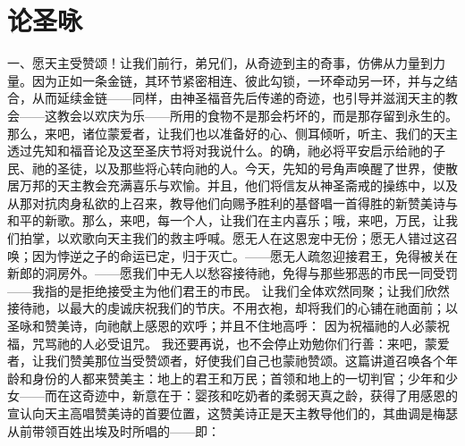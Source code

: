 
\chapter{论圣咏}


一、愿天主受赞颂！让我们前行，弟兄们，从奇迹到主的奇事，仿佛从力量到力量。因为正如一条金链，其环节紧密相连、彼此勾锁，一环牵动另一环，并与之结合，从而延续金链——同样，由神圣福音先后传递的奇迹，也引导并滋润天主的教会——这教会以欢庆为乐——所用的食物不是那会朽坏的，而是那存留到永生的。 那么，来吧，诸位蒙爱者，让我们也以准备好的心、侧耳倾听，听主、我们的天主透过先知和福音论及这至圣庆节将对我说什么。的确，祂必将平安启示给祂的子民、祂的圣徒，以及那些将心转向祂的人。今天，先知的号角声唤醒了世界，使散居万邦的天主教会充满喜乐与欢愉。并且，他们将信友从神圣斋戒的操练中，以及从那对抗肉身私欲的上召来，教导他们向赐予胜利的基督唱一首得胜的新赞美诗与和平的新歌。那么，来吧，每一个人，让我们在主内喜乐；哦，来吧，万民，让我们拍掌，以欢歌向天主我们的救主呼喊。愿无人在这恩宠中无份；愿无人错过这召唤；因为悖逆之子的命运已定，归于灭亡。——愿无人疏忽迎接君王，免得被关在新郎的洞房外。——愿我们中无人以愁容接待祂，免得与那些邪恶的市民一同受罚——我指的是拒绝接受主为他们君王的市民。 让我们全体欢然同聚；让我们欣然接待祂，以最大的虔诚庆祝我们的节庆。不用衣袍，却将我们的心铺在祂面前；以圣咏和赞美诗，向祂献上感恩的欢呼；并且不住地高呼： 因为祝福祂的人必蒙祝福，咒骂祂的人必受诅咒。 我还要再说，也不会停止劝勉你们行善：来吧，蒙爱者，让我们赞美那位当受赞颂者，好使我们自己也蒙祂赞颂。这篇讲道召唤各个年龄和身份的人都来赞美主：地上的君王和万民；首领和地上的一切判官；少年和少女——而在这奇迹中，新意在于：婴孩和吃奶者的柔弱天真之龄，获得了用感恩的宣认向天主高唱赞美诗的首要位置，这赞美诗正是天主教导他们的，其曲调是梅瑟从前带领百姓出埃及时所唱的——即：\par

